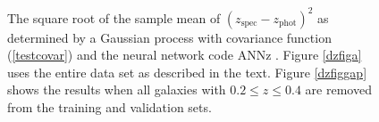 \documentclass[prd, nofootinbib, floatfix, 12pt,tightenlines]{revtex4}
\begin{document}
\begin{figure}[t]
\centerline{
}
\caption{
The square root of the sample mean of $(z_\text{spec}-z_\text{phot})^2$
as determined by a Gaussian process with covariance function (\ref{testcovar})
and the neural network code ANNz \cite{annz}.  Figure \ref{dzfiga} uses the
entire data set as described in the text.  Figure \ref{dzfiggap} shows the
results when all galaxies with $0.2\le z\le0.4$ are removed from the training and
validation sets.
}
\label{dzfig}
\end{figure}
\end{document}
